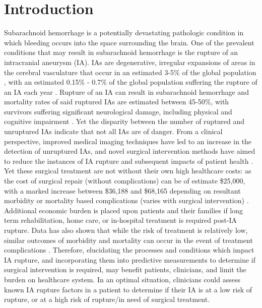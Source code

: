 \cleartooddpage[\thispagestyle{empty}]
\chapter{Introduction}\label{CHAPTER1}

Subarachnoid hemorrhage is a potentially devastating pathologic condition in which bleeding occurs into the space surrounding the brain. One of the prevalent conditions that may result in subarachnoid hemorrhage is the rupture of an intracranial aneurysm (IA). IAs are degenerative, irregular expansions of areas in the cerebral vasculature that occur in an estimated 3-5\% of the global population \cite{revilla2018prevalence,hackenberg2018unruptured,villablanca2013natural}, with an estimated 0.15\% - 0.7\% of the global population suffering the rupture of an IA each year \cite{hughes2018estimating}. Rupture of an IA can result in subarachnoid hemorrhage and mortality rates of said ruptured IAs are estimated between 45-50\%, with survivors suffering significant neurological damage, including physical and cognitive impairment \cite{LONGO2017632,villablanca2013natural}. Yet the disparity between the number of ruptured and unruptured IAs indicate that not all IAs are of danger. 
	From a clinical perspective, improved medical imaging techniques have led to an increase in the detection of unruptured IAs, and novel surgical intervention methods have aimed to reduce the instances of IA rupture and subsequent impacts of patient health \cite{molyneux2002international,komotar2008guidelines}. Yet these surgical treatment are not without their own high healthcare costs: as the cost of surgical repair (without complications) can  be of estimate \$25,000, with a marked increase between \$36,188 and \$68,165 depending on resultant morbidity or mortality based complications (varies with surgical intervention) \cite{brinjikji2012hospitalization}. Additional economic burden is placed upon patients and their families if long term rehabilitation, home care, or in-hospital treatment is required post-IA rupture. Data has also shown that while the risk of treatment is relatively low, similar outcomes of morbidity and mortality can occur in the event of treatment complications \cite{mascitelli2015predictors,liu2016recanalization,chalouhi2015safety}. Therefore, elucidating the processes and conditions which impact IA rupture, and incorporating them into predictive measurements to determine if surgical intervention is required, may benefit patients, clinicians, and limit the burden on healthcare system. In an optimal situation, clinicians could assess known IA rupture factors in a patient to determine if their IA is at a low risk of rupture, or at a high risk of rupture/in need of surgical treatment. 
	
